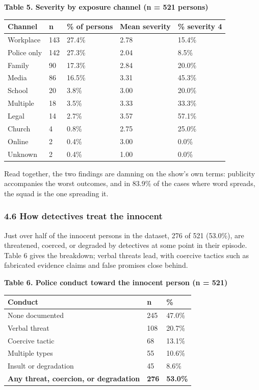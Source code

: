\documentclass[
]{article}
\newcounter{none} %
\begin{document}
\textbf{Table 5. Severity by exposure channel (n = 521 persons)}

{\def\LTcaptype{none} %
\begin{longtable}[]{@{}lllll@{}}
\toprule\noalign{}
Channel & n & \% of persons & Mean severity & \% severity 4 \\
\midrule\noalign{}
\endhead
\bottomrule\noalign{}
\endlastfoot
Workplace & 143 & 27.4\% & 2.78 & 15.4\% \\
Police only & 142 & 27.3\% & 2.04 & 8.5\% \\
Family & 90 & 17.3\% & 2.84 & 20.0\% \\
Media & 86 & 16.5\% & 3.31 & 45.3\% \\
School & 20 & 3.8\% & 3.00 & 20.0\% \\
Multiple & 18 & 3.5\% & 3.33 & 33.3\% \\
Legal & 14 & 2.7\% & 3.57 & 57.1\% \\
Church & 4 & 0.8\% & 2.75 & 25.0\% \\
Online & 2 & 0.4\% & 3.00 & 0.0\% \\
Unknown & 2 & 0.4\% & 1.00 & 0.0\% \\
\end{longtable}
}

Read together, the two findings are damning on the show's own terms:
publicity accompanies the worst outcomes, and in 83.9\% of the cases
where word spreads, the squad is the one spreading it.

\subsubsection{4.6 How detectives treat the
innocent}\label{how-detectives-treat-the-innocent}

Just over half of the innocent persons in the dataset, 276 of 521
(53.0\%), are threatened, coerced, or degraded by detectives at some
point in their episode. Table 6 gives the breakdown; verbal threats
lead, with coercive tactics such as fabricated evidence claims and false
promises close behind.

\textbf{Table 6. Police conduct toward the innocent person (n = 521)}

{\def\LTcaptype{none} %
\begin{longtable}[]{@{}lll@{}}
\toprule\noalign{}
Conduct & n & \% \\
\midrule\noalign{}
\endhead
\bottomrule\noalign{}
\endlastfoot
None documented & 245 & 47.0\% \\
Verbal threat & 108 & 20.7\% \\
Coercive tactic & 68 & 13.1\% \\
Multiple types & 55 & 10.6\% \\
Insult or degradation & 45 & 8.6\% \\
\textbf{Any threat, coercion, or degradation} & \textbf{276} &
\textbf{53.0\%} \\
\end{longtable}
}
\end{document}
